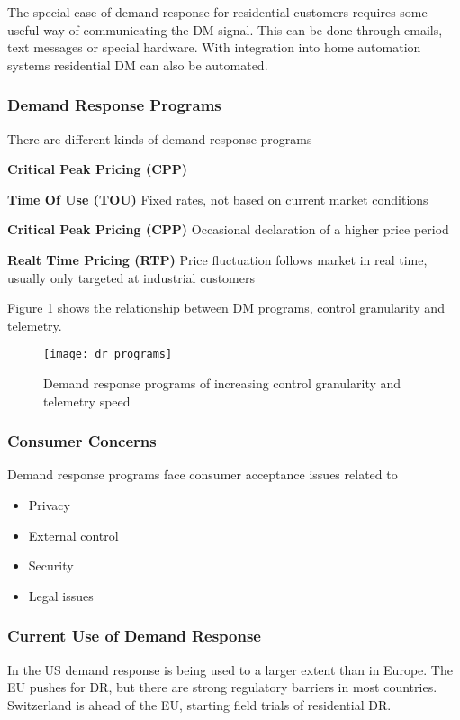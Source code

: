 The special case of demand response for residential customers requires some useful way of communicating the DM signal.
This can be done through emails, text messages or special hardware.
With integration into home automation systems residential DM can also be automated.

\subsubsection{Demand Response Programs}
There are different kinds of demand response programs

\begin{labeling}{\textbf{Critical Peak Pricing (CPP)}}
    \item [\textbf{Time Of Use (TOU)}]
    Fixed rates, not based on current market conditions

    \item [\textbf{Critical Peak Pricing (CPP)}]
    Occasional declaration of a higher price period

    \item [\textbf{Realt Time Pricing (RTP)}]
    Price fluctuation follows market in real time, usually only targeted at industrial customers

\end{labeling}

Figure \ref{fig:dr_programs} shows the relationship between DM programs, control granularity and telemetry.

\begin{figure}
    \centering
    \texttt{[image: dr\_programs]}
    \caption{Demand response programs of increasing control granularity and telemetry speed}
    \label{fig:dr_programs}
\end{figure}

\subsubsection{Consumer Concerns}
Demand response programs face consumer acceptance issues related to
\begin{itemize}
    \item Privacy
    \item External control
    \item Security
    \item Legal issues
\end{itemize}

\subsubsection{Current Use of Demand Response}
In the US demand response is being used to a larger extent than in Europe.
The EU pushes for DR, but there are strong regulatory barriers in most countries.
Switzerland is ahead of the EU, starting field trials of residential DR.
